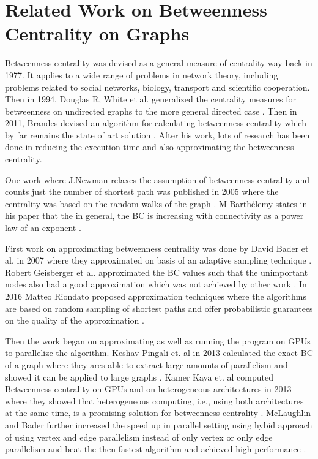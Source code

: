 \chapter{Related Work on Betweenness Centrality on Graphs}
\label{chap:relwork}

Betweenness centrality was devised as a general measure of centrality way back in 1977. It applies to a wide range of problems in network theory, including problems related to social networks, biology, transport and scientific cooperation. Then in 1994, Douglas R, White et al. generalized the centrality measures for betweenness on undirected graphs to the more general directed case \cite{WHITE1994335}. Then in 2011, Brandes devised an algorithm for calculating betweenness centrality which by far remains the state of art solution \cite{doi:10.1080/0022250X.2001.9990249}. After his work, lots of research has been done in reducing the execution time and also approximating the betweenness centrality. 

One work where J.Newman relaxes the assumption of betweenness centrality and counts just the number of shortest path was published in 2005 where the centrality was based on the random walks of the graph \cite{NEWMAN200539}. M Barthélemy states in his paper that the in general, the BC is increasing with connectivity as a power law of an exponent \cite{Barthélemy2004}. 

First work on approximating betweenness centrality was done by David Bader et al. in 2007 where they approximated on basis of an adaptive sampling technique \cite{Bader2007}. Robert Geisberger et al. approximated the BC values such that the unimportant nodes also had a good approximation which was not achieved by other work \cite{Geisberger:2008:BAB:2791204.2791213}. In 2016 Matteo Riondato proposed approximation techniques where the algorithms are based on random sampling of shortest paths and offer probabilistic guarantees on the quality of the approximation \cite{Riondato2016}.

Then the work began on approximating as well as running the program on GPUs to parallelize the algorithm. Keshav Pingali et. al in 2013 calculated the exact BC of a graph where they ares able to extract large amounts of parallelism and showed it can be  applied to large graphs \cite{Prountzos:2013:BCA:2517327.2442521}. Kamer Kaya et. al computed Betweenness centrality on GPUs and on heterogeneous architectures in 2013 where they showed that heterogeneous computing, i.e., using both architectures at the same time, is a promising solution for betweenness centrality \cite{Sariyuce:2013:BCG:2458523.2458531}. McLaughlin and Bader further increased the speed up in parallel setting using hybid approach of using vertex and edge parallelism instead of only vertex or only edge parallelism and beat the then fastest algorithm and achieved high performance \cite{McLaughlin:2014:SHP:2683593.2683656}. 
